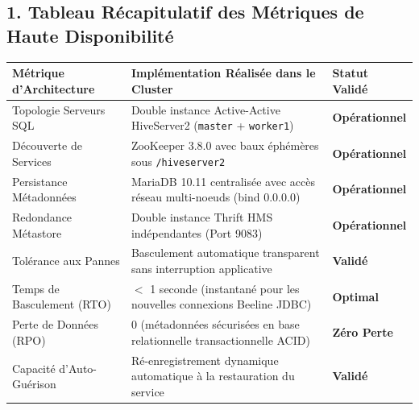 \documentclass[11pt,a4paper]{article}
\begin{document}
\subsection*{1. Tableau Récapitulatif des Métriques de Haute Disponibilité}
\begin{center}
\small
\begin{tabularx}{\linewidth}{lXl}
\toprule
\textbf{Métrique d'Architecture} & \textbf{Implémentation Réalisée dans le Cluster} & \textbf{Statut Validé} \\
\midrule
Topologie Serveurs SQL & Double instance Active-Active HiveServer2 (\texttt{master} + \texttt{worker1}) & \textbf{Opérationnel} \\
Découverte de Services & ZooKeeper 3.8.0 avec baux éphémères sous \texttt{/hiveserver2} & \textbf{Opérationnel} \\
Persistance Métadonnées & MariaDB 10.11 centralisée avec accès réseau multi-noeuds (bind 0.0.0.0) & \textbf{Opérationnel} \\
Redondance Métastore & Double instance Thrift HMS indépendantes (Port 9083) & \textbf{Opérationnel} \\
Tolérance aux Pannes & Basculement automatique transparent sans interruption applicative & \textbf{Validé} \\
Temps de Basculement (RTO) & $<$ 1 seconde (instantané pour les nouvelles connexions Beeline JDBC) & \textbf{Optimal} \\
Perte de Données (RPO) & 0 (métadonnées sécurisées en base relationnelle transactionnelle ACID) & \textbf{Zéro Perte} \\
Capacité d'Auto-Guérison & Ré-enregistrement dynamique automatique à la restauration du service & \textbf{Validé} \\
\bottomrule
\end{tabularx}
\end{center}
\end{document}
